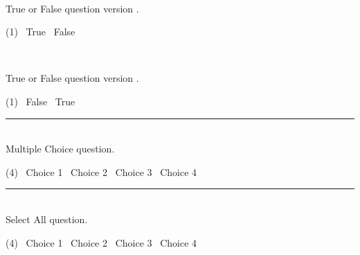 \begin{question}[class=A]{2}
  \label{question:true-false-a}
  \TrueFalseInstructions \\
  \begin{minipage}{0.85\textwidth}
    True or False question version \GetVersionID.
  \end{minipage}%
  \begin{minipage}{0.15\textwidth}
    \begin{tasks}(1)
      \task[\choice] \ True
      \task[\correctchoice] \ False
    \end{tasks}
  \end{minipage}
\end{question}

\begin{question}[class=B]{2}
  \label{question:true-false-b}
  \TrueFalseInstructions \\
  \begin{minipage}{0.85\textwidth}
    True or False question version \GetVersionID.
  \end{minipage}%
  \begin{minipage}{0.15\textwidth}
    \begin{tasks}(1)
      \task[\correctchoice] \ False
      \task[\choice] \ True
    \end{tasks}
  \end{minipage}
\end{question}

\noindent\rule{\textwidth}{1pt}

\begin{question}[class=Z]{3}
  \label{question:multiple-choice}
  \MultipleChoiceInstructions \\

  Multiple Choice question.
  \begin{tasks}(4)
    \task[\choice] \ Choice 1
    \task[\correctchoice] \ Choice 2
    \task[\choice] \ Choice 3
    \task[\choice] \ Choice 4
  \end{tasks}
\end{question}

\noindent\rule{\textwidth}{1pt}

\begin{question}[class=Z]{3}
  \label{question:select-all}
  \SelectAllInstructions \\

  Select All question.
  \begin{tasks}(4)
    \task[\selectall] \ Choice 1
    \task[\correctselectall] \ Choice 2
    \task[\selectall] \ Choice 3
    \task[\selectall] \ Choice 4
  \end{tasks}
\end{question}

